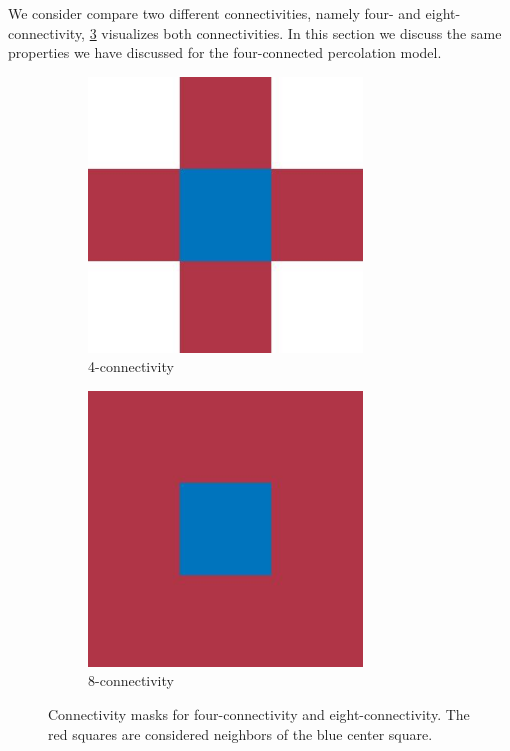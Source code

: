 We consider compare two different connectivities, namely four- and eight-connectivity, \cref{fig:exp:connectivity} visualizes both connectivities. In this section we discuss the same properties we have discussed for the four-connected percolation model.\\

\begin{figure}
	\centering
	\begin{subfigure}{0.45\columnwidth}
		\centering
		\includegraphics[width=0.8\textwidth]{./img/exp_mask_four.jpg}
		\caption{4-connectivity}
		\label{fig:exp:connectivity:fourMask}
	\end{subfigure}
	\begin{subfigure}{0.45\columnwidth}
		\centering
		\includegraphics[width=0.8\textwidth]{./img/exp_mask_eight.jpg}
		\caption{8-connectivity}
		\label{fig:exp:connectivity:eightMask}
	\end{subfigure}	
	\caption{Connectivity masks for  four-connectivity and  eight-connectivity. The red squares are considered neighbors of the blue center square.}
	\label{fig:exp:connectivity}
\end{figure}


